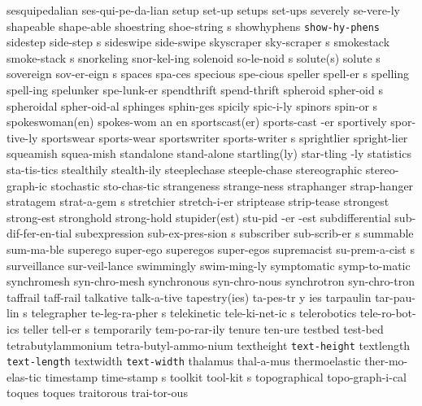\1 sesquipedalian	ses-qui-pe-da-lian	%
\1 setup		set-up
\1 setups		set-ups
\1 severely		se-vere-ly
\1 shapeable		shape-able
\5 shoestring		shoe-string s
\NewWordtrue
\1 showhyphens		{\tt\bs show-hy-phens}	%
\5 sidestep		side-step s
\1 sideswipe		side-swipe
\5 skyscraper		sky-scraper s
\5 smokestack		smoke-stack s
\1 snorkeling		snor-kel-ing
\5 solenoid		so-le-noid s
\2 solute(s)		solute s
\5 sovereign		sov-er-eign s
\1 spaces		spa-ces
\1 specious		spe-cious
\5 speller		spell-er s		%
\1 spelling		spell-ing		%
\1 spelunker		spe-lunk-er
\1 spendthrift		spend-thrift
\5 spheroid		spher-oid s
\1 spheroidal		spher-oid-al
\1 sphinges		sphin-ges
\1 spicily		spic-i-ly
\5 spinors		spin-or s
\3 spokeswoman(en)	spokes-wom an en
\2 sportscast(er)	sports-cast -er
\1 sportively		spor-tive-ly
\1 sportswear		sports-wear
\5 sportswriter		sports-writer s
\1 sprightlier		spright-lier
\1 squeamish		squea-mish
\1 standalone		stand-alone
\2 startling(ly)	star-tling -ly
\1 statistics		sta-tis-tics
\1 stealthily		stealth-ily
\1 steeplechase		steeple-chase
\1 stereographic	stereo-graph-ic		%
\1 stochastic		sto-chas-tic
\1 strangeness		strange-ness
\1 straphanger		strap-hanger		%
\5 stratagem		strat-a-gem s
\1 stretchier		stretch-i-er
\1 striptease		strip-tease		%
\1 strongest		strong-est
\1 stronghold		strong-hold
\3 stupider(est)	stu-pid -er -est
\1 subdifferential	sub-dif-fer-en-tial	%
\5 subexpression	sub-ex-pres-sion s	%
\5 subscriber 		sub-scrib-er s
\1 summable		sum-ma-ble
\1 superego		super-ego
\1 superegos		super-egos
\5 supremacist		su-prem-a-cist s
\1 surveillance		sur-veil-lance
\1 swimmingly		swim-ming-ly
\1 symptomatic		symp-to-matic
\1 synchromesh		syn-chro-mesh
\1 synchronous		syn-chro-nous
\1 synchrotron		syn-chro-tron
\1 taffrail		taff-rail		%
\1 talkative		talk-a-tive
\3 tapestry(ies)	ta-pes-tr y ies
\5 tarpaulin		tar-pau-lin s
\5 telegrapher		te-leg-ra-pher s
\5 telekinetic		tele-ki-net-ic s
\1 telerobotics		tele-ro-bot-ics
\5 teller		tell-er s		%
\1 temporarily		tem-po-rar-ily		%
\1 tenure		ten-ure
\1 testbed		test-bed
\NewWordtrue
\1 tetrabutylammonium	tetra-butyl-ammo-nium	%
\1 textheight		{\tt\bs text-height}	%
\1 textlength		{\tt\bs text-length}	%
\1 textwidth		{\tt\bs text-width}
\1 thalamus		thal-a-mus
\1 thermoelastic	ther-mo-elas-tic
\5 timestamp		time-stamp s
\5 toolkit		tool-kit s
\1 topographical	topo-graph-i-cal
\1 toques		toques
\1 traitorous		trai-tor-ous
